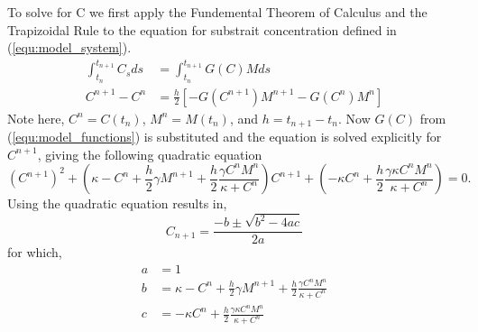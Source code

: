   To solve for C we first apply the Fundemental Theorem of Calculus and the Trapizoidal Rule to the equation for substrait concentration defined in (\ref{equ:model_system}).
  \begin{equation}
  \begin{aligned}
    \int^{t_{n+1}}_{t_n} C_s ds &= \int^{t_{n+1}}_{t_n} G(C)M ds \\
    C^{n+1} - C^n &= \frac{h}{2} \left[ -G(C^{n+1}) M^{n+1} - G(C^n) M^n \right]
  \end{aligned}
  \end{equation}
  Note here, $C^n = C(t_n)$, $M^n = M(t_n)$, and $h = t_{n+1} - t_n$.
  Now $G(C)$ from (\ref{equ:model_functions}) is substituted and the equation is solved explicitly for $C^{n+1}$, giving the following quadratic equation
  \begin{equation}  
    \left(C^{n+1}\right)^2 + \left( \kappa - C^n + \frac{h}{2} \gamma M^{n+1} + \frac{h}{2} \frac{ \gamma C^n M^n}{\kappa + C^n} \right) C^{n+1} + \left( -\kappa C^n + \frac{h}{2} \frac{\gamma \kappa C^n M^n}{\kappa + C^n} \right) = 0.
  \end{equation}
  Using the quadratic equation results in, 
  \begin{equation} \label{eq:Cquad}
    C_{n+1} = \frac{-b \pm \sqrt{b^2 - 4ac}}{2a}
  \end{equation}  
  for which, 
  \begin{equation} \begin{aligned} \label{para:abc}
    a &= 1\\
    b &= \kappa - C^n + \frac{h}{2} \gamma M^{n+1} + \frac{h}{2} \frac{\gamma C^n M^n}{\kappa + C^n} \\
    c &= -\kappa C^n + \frac{h}{2} \frac{\gamma \kappa C^n M^n}{\kappa + C^n}
  \end{aligned}  \end{equation}
  

